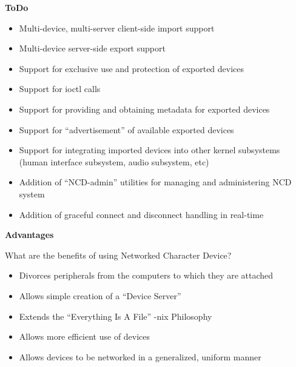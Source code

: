 \documentclass[xcolor=dvipsnames]{beamer}
\begin{document}
\begin{frame}{\bf ToDo}

\begin{itemize}
\item Multi-device, multi-server client-side import support
\item Multi-device server-side export support
\item Support for exclusive use and protection of exported devices
\item Support for ioctl calls
\item Support for providing and obtaining metadata for exported
  devices
\item Support for ``advertisement'' of available exported devices
\item Support for integrating imported devices into other kernel
  subsystems (human interface subsystem, audio subsystem, etc)
\item Addition of ``NCD-admin'' utilities for managing and administering
  NCD system
\item Addition of graceful connect and disconnect handling in real-time
\end{itemize}

\end{frame}

\begin{frame}{\bf Advantages}

What are the benefits of using Networked Character Device?

\begin{itemize}
\item Divorces peripherals from the computers to which they are
  attached
\item Allows simple creation of a ``Device Server''
\item Extends the ``Everything Is A File'' -nix Philosophy
\item Allows more efficient use of devices
\item Allows devices to be networked in a generalized, uniform manner
\end{itemize}

\end{frame}
\end{document}
